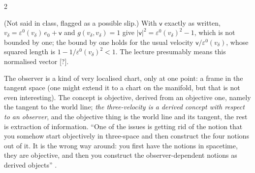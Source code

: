\begin{paracol}{2}
\begin{coursenote}
(Not said in class, flagged as a possible slip.) With $\mathsf v$ exactly as written, $v_\delta=\varepsilon^0(v_\delta)\,e_0+\mathsf v$ and $g(v_\delta,v_\delta)=1$ give $|\mathsf v|^2=\varepsilon^0(v_\delta)^2-1$, which is not bounded by one; the bound by one holds for the usual velocity $\mathsf v/\varepsilon^0(v_\delta)$, whose squared length is $1-1/\varepsilon^0(v_\delta)^2<1$. The lecture presumably means this normalised vector [?].
\end{coursenote}
The observer is a kind of very localised chart, only at one point: a frame in the tangent space (one might extend it to a chart on the manifold, but that is not even interesting). The concept is objective, derived from an objective one, namely the tangent to the world line; \emph{the three-velocity is a derived concept with respect to an observer}, and the objective thing is the world line and its tangent, the rest is extraction of information. ``One of the issues is getting rid of the notion that you somehow start objectively in three-space and then construct the four notions out of it. It is the wrong way around: you first have the notions in spacetime, they are objective, and then you construct the observer-dependent notions as derived objects'' .


\end{paracol}
